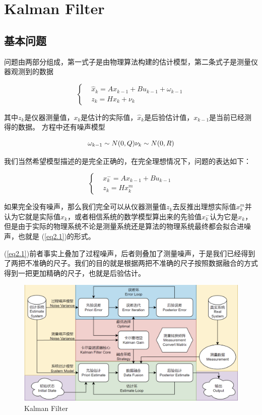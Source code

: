 \chapter{Kalman Filter}

\section{基本问题}

问题由两部分组成，第一式子是由物理算法构建的估计模型，第二条式子是测量仪器观测到的数据

\begin{equation}
    \begin{cases}
       & \hat{x}_k= Ax_{k-1}+Bu_{k-1}+\omega_{k-1}\\
       & z_k = H x_k+\nu_k
    \end{cases}
    \label{eq2.1}
\end{equation}

其中$z_k$是仪器测量值，$x_k$是估计的实际值，$\hat{x}_k$是后验估计值，$x_{k-1}$是当前已经测得的数据。
方程中还有噪声模型

\begin{equation}
    \omega_{k-1}\sim N(0,Q)$$ $$\nu_{k}\sim N(0,R)
\end{equation}

我们当然希望模型描述的是完全正确的，在完全理想情况下，问题的表达如下：

\begin{equation}
    \begin{cases}
       & x^{-}_k= Ax_{k-1}+Bu_{k-1}\\
       & z_k = H x^{m}_k
    \end{cases}
\end{equation}

如果完全没有噪声，那么我们完全可以从仪器测量值$z_k$去反推出理想实际值$x^{m}_k$并认为它就是实际值$x_k$，或者相信系统的数学模型算出来的先验值$x^{-}_k$认为它是$x_k$，但是由于实际的物理系统不论是测量系统还是算法的物理系统最终都会拟合进噪声，也就是
(\ref{eq2.1})的形式。

(\ref{eq2.1})前者事实上叠加了过程噪声，后者则叠加了测量噪声，于是我们已经得到了两把不准确的尺子。我们的目的就是根据两把不准确的尺子按照数据融合的方式得到一把更加精确的尺子，也就是后验估计。

\begin{figure}[H]
    \centering
    \includegraphics[scale=0.3]{figures/Kalman-Filter.png}
    \caption{Kalman Filter}
\end{figure}

